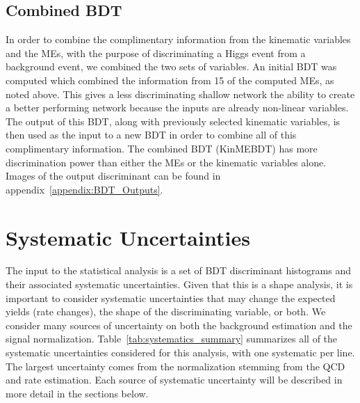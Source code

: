 \subsection{Combined BDT}

In order to combine the complimentary information from the kinematic variables and the MEs, with the purpose of discriminating a Higgs event from a background event, we combined the two sets of variables.
An initial BDT was computed which combined the information from 15 of the computed MEs, as noted above.
This gives a less discriminating shallow network the ability to create a better performing network because the inputs are already non-linear variables.
The output of this BDT, along with previously selected kinematic variables, is then used as the input to a new BDT in order to combine all of this complimentary information.
The combined BDT (KinMEBDT) has more discrimination power than either the MEs or the kinematic variables alone.
Images of the output discriminant can be found in appendix~\ref{appendix:BDT_Outputs}.















































\section{Systematic Uncertainties}

The input to the statistical analysis is a set of BDT discriminant histograms and their associated systematic uncertainties.
Given that this is a shape analysis, it is important to consider systematic uncertainties that may change the expected yields (rate changes), the shape of the discriminating variable, or both.
We consider many sources of uncertainty on both the background estimation and the signal normalization.
Table~\ref{tab:systematics_summary} summarizes all of the systematic uncertainties considered for this analysis, with one systematic per line.
The largest uncertainty comes from the \Wjets normalization stemming from the QCD and \Wjets rate estimation.
Each source of systematic uncertainty will be described in more detail in the sections below.

